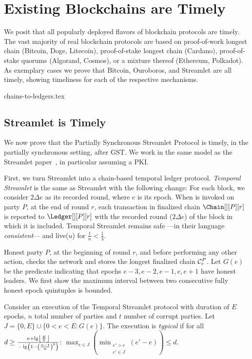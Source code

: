 \section{Existing Blockchains are Timely}\label{sec:possible}

We posit that all popularly deployed flavors of blockchain protocols are timely.
The vast majority of real blockchain protocols are based on proof-of-work longest chain
(Bitcoin, Doge, Litecoin),
proof-of-stake longest chain
(Cardano),
proof-of-stake quorums
(Algorand, Cosmos),
or a mixture thereof
(Ethereum, Polkadot). As exemplary cases we prove that Bitcoin, Ouroboros, and Streamlet
are all timely, showing timeliness for each of the respective mechanisms.

{chains-to-ledgers.tex}

\subsection{Streamlet is Timely}

We now prove that the Partially Synchronous Streamlet Protocol is timely,
in the partially synchronous setting, after GST.
We work in the same model as the Streamlet paper~\cite{streamlet},
in particular assuming a PKI.

First, we turn Streamlet into a chain-based temporal ledger protocol.
\emph{Temporal Streamlet} is the same as Streamlet with the
following change:
For each block, we consider $2\Delta e$ as its recorded round, where $e$ is its epoch.
When \rread is invoked on party $P$, at the end of round $r$, each transaction
in finalized chain $\Chain[][P][r]$ is reported to $\Ledger[][P][r]$ with the recorded
round ($2\Delta e$) of the block in which it is included.
Temporal Streamlet remains safe ---in their language \emph{consistent}--- and live($u$)
for $\frac{t}{n} < \frac{1}{3}$.

Honest party $P$, at the beginning of round $r$, and
before performing any other action, checks the network and
stores the longest finalized chain $\chain^P_r$. 
Let $G(e)$ be the predicate indicating that epochs $e-3,e-2,e-1,e,e+1$ have honest leaders.
We first show the maximum interval between two consecutive fully honest epoch quintuples
is bounded.

\begin{definition}
  Consider an execution of the Temporal Streamlet protocol with duration
  of $E$ epochs, $n$ total number of parties and $t$ number of corrupt parties.
  Let $J = \{0,E\} \cup \{0 < e < E: G(e)\}$.
  The execution is \emph{typical} if for all
  $d \geq \frac{\kappa + \lg \floor*{\frac{E}{5}}}{- \lg \left(1 - \left(\frac{n - t}{n}\right)^5\right)}$:
  $\max_{e \in J}(\min_{\substack{e' > e \\ e' \in J}}(e' - e)) \leq d$.
\end{definition}

